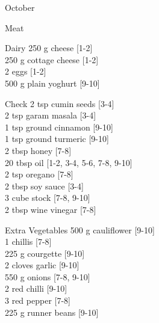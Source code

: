 \begin{menu}{October}
\begin{shoppinglist}{Meat}
      \end{shoppinglist}%
      \begin{shoppinglist}{Dairy}
      250 g cheese 
        {\scriptsize[1-2]}\\
      250 g cottage cheese 
        {\scriptsize[1-2]}\\
      2  eggs 
        {\scriptsize[1-2]}\\
      500 g plain yoghurt 
        {\scriptsize[9-10]}\\
      \end{shoppinglist}%
      \par\vfil %
      \vfil\clearpage %
      \begin{shoppinglist}{Check}
      2 tsp cumin seeds 
        {\scriptsize[3-4]}\\
      2 tsp garam masala 
        {\scriptsize[3-4]}\\
      1 tsp ground cinnamon 
        {\scriptsize[9-10]}\\
      1 tsp ground turmeric 
        {\scriptsize[9-10]}\\
      2 tbsp honey 
        {\scriptsize[7-8]}\\
      20 tbsp oil 
        {\scriptsize[1-2, 3-4, 5-6, 7-8, 9-10]}\\
      2 tsp oregano 
        {\scriptsize[7-8]}\\
      2 tbsp soy sauce 
        {\scriptsize[3-4]}\\
      3 cube stock 
        {\scriptsize[7-8, 9-10]}\\
      2 tbsp wine vinegar 
        {\scriptsize[7-8]}\\
      \end{shoppinglist}%
      \begin{shoppinglist}{Extra Vegetables}
      500 g cauliflower 
        {\scriptsize[9-10]}\\
      1  chillis 
        {\scriptsize[7-8]}\\
      225 g courgette 
        {\scriptsize[9-10]}\\
      2 cloves garlic 
        {\scriptsize[9-10]}\\
      550 g onions 
        {\scriptsize[7-8, 9-10]}\\
      2  red chilli 
        {\scriptsize[9-10]}\\
      3  red pepper 
        {\scriptsize[7-8]}\\
      225 g runner beans 
        {\scriptsize[9-10]}\\
      \end{shoppinglist}%
      \par\vfil %
    \vfil\clearpage
  

\end{menu}
